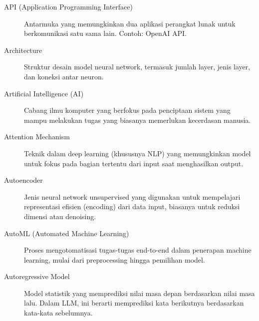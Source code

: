 \begin{description}
    \item[API (Application Programming Interface)] Antarmuka yang memungkinkan dua aplikasi perangkat lunak untuk berkomunikasi satu sama lain. Contoh: OpenAI API.
    \item[Architecture] Struktur desain model neural network, termasuk jumlah layer, jenis layer, dan koneksi antar neuron.
    \item[Artificial Intelligence (AI)] Cabang ilmu komputer yang berfokus pada penciptaan sistem yang mampu melakukan tugas yang biasanya memerlukan kecerdasan manusia.
    \item[Attention Mechanism] Teknik dalam deep learning (khususnya NLP) yang memungkinkan model untuk fokus pada bagian tertentu dari input saat menghasilkan output.
    \item[Autoencoder] Jenis neural network unsupervised yang digunakan untuk mempelajari representasi efisien (encoding) dari data input, biasanya untuk reduksi dimensi atau denoising.
    \item[AutoML (Automated Machine Learning)] Proses mengotomatisasi tugas-tugas end-to-end dalam penerapan machine learning, mulai dari preprocessing hingga pemilihan model.
    \item[Autoregressive Model] Model statistik yang memprediksi nilai masa depan berdasarkan nilai masa lalu. Dalam LLM, ini berarti memprediksi kata berikutnya berdasarkan kata-kata sebelumnya.
\end{description}

